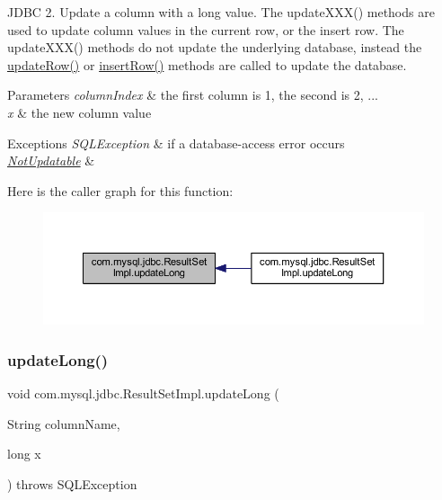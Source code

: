 J\+D\+BC 2. Update a column with a long value. The update\+X\+X\+X() methods are used to update column values in the current row, or the insert row. The update\+X\+X\+X() methods do not update the underlying database, instead the \mbox{\hyperlink{classcom_1_1mysql_1_1jdbc_1_1_result_set_impl_a2842d32292d023aaeeafedeed3322981}{update\+Row()}} or \mbox{\hyperlink{classcom_1_1mysql_1_1jdbc_1_1_result_set_impl_a78e304e3279cbcf60392f18c1385e3bf}{insert\+Row()}} methods are called to update the database.


\begin{DoxyParams}{Parameters}
{\em column\+Index} & the first column is 1, the second is 2, ... \\
\hline
{\em x} & the new column value\\
\hline
\end{DoxyParams}

\begin{DoxyExceptions}{Exceptions}
{\em S\+Q\+L\+Exception} & if a database-\/access error occurs \\
\hline
{\em \mbox{\hyperlink{classcom_1_1mysql_1_1jdbc_1_1_not_updatable}{Not\+Updatable}}} & \\
\hline
\end{DoxyExceptions}
Here is the caller graph for this function\+:
\nopagebreak
\begin{figure}[H]
\begin{center}
\leavevmode
\includegraphics[width=350pt]{classcom_1_1mysql_1_1jdbc_1_1_result_set_impl_a58134de00af85af2be71ff502a060766_icgraph}
\end{center}
\end{figure}
\mbox{\label{classcom_1_1mysql_1_1jdbc_1_1_result_set_impl_a29e1c50192c84c22ab2d81d3ed5b94ee}} 
\subsubsection{\texorpdfstring{update\+Long()}{updateLong()}\hspace{0.1cm}{\footnotesize\ttfamily [2/2]}}
{\footnotesize\ttfamily void com.\+mysql.\+jdbc.\+Result\+Set\+Impl.\+update\+Long (\begin{DoxyParamCaption}\item[{String}]{column\+Name,  }\item[{long}]{x }\end{DoxyParamCaption}) throws S\+Q\+L\+Exception}

